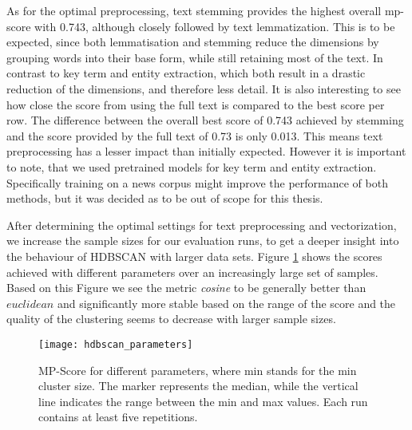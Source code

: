 As for the optimal preprocessing, text stemming provides the highest overall mp-score with 0.743, although closely followed by text lemmatization. This is to be expected, since both lemmatisation and stemming reduce the dimensions by grouping words into their base form, while still retaining most of the text.
In contrast to key term and entity extraction, which both result in a drastic reduction of the dimensions, and therefore less detail. It is also interesting to see how close the score from using the full text is compared to the best score per row. The difference between the overall best score of 0.743 achieved by stemming and the score provided by the full text of 0.73 is only 0.013. This means text preprocessing has a lesser impact than initially expected.   
However it is important to note, that we used pretrained models for key term and entity extraction.
Specifically training on a news corpus might improve the performance of both methods, but it was decided as to be out of scope for this thesis.

After determining the optimal settings for text preprocessing and vectorization, we increase the sample sizes for our evaluation runs, to get a deeper insight into the behaviour of HDBSCAN with larger data sets. Figure \ref{fig:hdbscan_parameters} shows the scores achieved with different parameters over an increasingly large set of samples. Based on this Figure we see the metric \textit{cosine} to be generally better than $euclidean$ and significantly more stable based on the range of the score and the quality of the clustering seems to decrease with larger sample sizes.

\begin{figure}[h]
    \centering
    \texttt{[image: hdbscan\_parameters]}
    \caption{MP-Score for different parameters, where min stands for the min cluster size. The marker represents the median, while the vertical line indicates the range between the min and max values. Each run contains at least five repetitions.}
    \label{fig:hdbscan_parameters}
\end{figure}

